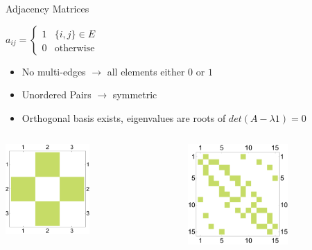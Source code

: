 \documentclass{beamer}
\begin{document}
\begin{frame}[t]{Adjacency Matrices}
	\begin{exampleblock}{}
	\setlength\abovedisplayskip{-8pt}
	\begin{center}
		$a_{ij} = \left\{
	\begin{array}{ll}
		1  & \{i,j\} \in E \\
		0  & \text{otherwise}
	\end{array}
\right.$	
	\end{center}
	\end{exampleblock}
	\begin{itemize}
		\item No multi-edges $\rightarrow$ all elements either $0$ or $1$
		\item Unordered Pairs $\rightarrow$ symmetric
		\item Orthogonal basis exists, eigenvalues are roots of $det(A-\lambda \text{1}) = 0$
	\end{itemize}
	\begin{columns}[T]
		\begin{column}{0.5\textwidth}
			\centering
   			\includegraphics[trim=0 0 0 5mm, width=0.5\textwidth]{Images/adj_chain3}
		\end{column}
		\begin{column}{0.5\textwidth}
			\centering
    		\includegraphics[trim=0 0 0 18mm, width=0.6\textwidth]{Images/adj_ring6_2}
		\end{column}
	\end{columns}
\end{frame}
\end{document}
